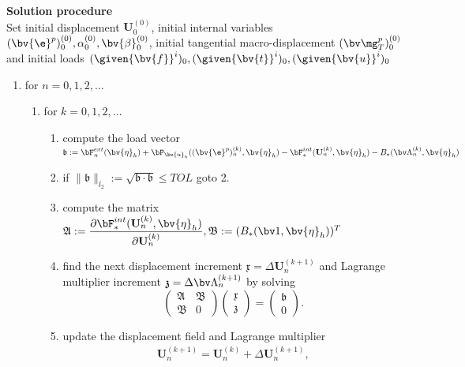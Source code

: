 {\bf Solution procedure} \\
Set initial displacement $\mathbf{U}^{(0)}_{0}$, initial internal variables $(\bv{\e}^p)^{(0)}_0, \alpha^{(0)}_0, \bv{\beta}^{(0)}_0 $, initial tangential macro-displacement $(\bv \mg^p_T)^{(0)}_0$ and initial loads $(\given{\bv{f}}^i)_0, (\given{\bv{t}}^i)_0, (\given{\bv{u}}^i)_0$
\begin{enumerate}
\item for $n=0,1,2,\dots$
  \begin{enumerate}
  \item for $k=0,1,2,\dots$
    \begin{enumerate}
    \item compute the load vector \\
          $\mathfrak b :=  \bF^{ext}_{n}(\bv{\eta}_h)
+ \bP_{\bv{u}_{h}} ( (\bv{\e}^p)^{(k)}_{n},\bv{\eta}_h) 
- \bF^{int}_*(\mathbf{U}^{(k)}_{n}, \bv{\eta}_h) 
- B_*(\bv \Lambda^{(k)}_n, \bv{\eta}_h)$
    \item if $\| \mathfrak b\|_{l_2} := \sqrt{\mathfrak b \cdot \mathfrak b} \leq TOL$ goto 2.
    \item compute the matrix $\mathfrak  A := \dfrac{\partial \bF^{int}_* (\mathbf{U}^{(k)}_{n} ,\bv{\eta}_h)}{\partial \mathbf{U}^{(k)}_{n}}, \mathfrak  B := (B_*( \bv 1, \bv{\eta}_h))^T$
    \item find the next displacement increment $\mathfrak x = \Delta \mathbf{U}^{(k+1)}_{n}$ and Lagrange multiplier increment $\mathfrak z = \Delta \bv \Lambda^{(k+1)}_{n}$ by solving
\begin{equation*}
\left( 
\begin{array}{cc}
\mathfrak A & \mathfrak B \\
\mathfrak B & 0
\end{array}
\right) 
\left( 
\begin{array}{c}
\mathfrak x \\
\mathfrak z 
\end{array}
\right) 
=
\left( 
\begin{array}{c}
\mathfrak b \\
0 
\end{array}
\right).
\end{equation*}
    \item update the displacement field and Lagrange multiplier
      \begin{equation*}
      \begin{array}{c}
        \mathbf{U}^{(k+1)}_{n} = \mathbf{U}^{(k)}_{n} + \Delta \mathbf{U}^{(k+1)}_{n}, \\[2ex]

\end{array}
\end{equation*}
\end{enumerate}
\end{enumerate}
\end{enumerate}
